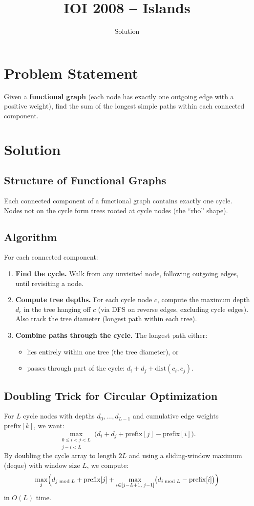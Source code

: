 \documentclass[11pt,a4paper]{article}
\title{IOI 2008 -- Islands}
\author{Solution}
\date{}
\begin{document}
\maketitle

\section{Problem Statement}
Given a \textbf{functional graph} (each node has exactly one outgoing edge with a positive weight), find the sum of the longest simple paths within each connected component.

\section{Solution}

\subsection{Structure of Functional Graphs}
Each connected component of a functional graph contains exactly one cycle. Nodes not on the cycle form trees rooted at cycle nodes (the ``rho'' shape).

\subsection{Algorithm}
For each connected component:
\begin{enumerate}
    \item \textbf{Find the cycle.} Walk from any unvisited node, following outgoing edges, until revisiting a node.
    \item \textbf{Compute tree depths.} For each cycle node $c$, compute the maximum depth $d_c$ in the tree hanging off $c$ (via DFS on reverse edges, excluding cycle edges). Also track the tree diameter (longest path within each tree).
    \item \textbf{Combine paths through the cycle.} The longest path either:
    \begin{itemize}
        \item lies entirely within one tree (the tree diameter), or
        \item passes through part of the cycle: $d_i + d_j + \text{dist}(c_i, c_j)$.
    \end{itemize}
\end{enumerate}

\subsection{Doubling Trick for Circular Optimization}
For $L$ cycle nodes with depths $d_0, \ldots, d_{L-1}$ and cumulative edge weights $\text{prefix}[k]$, we want:
\[
\max_{\substack{0 \le i < j < L \\ j - i < L}} \bigl(d_i + d_j + \text{prefix}[j] - \text{prefix}[i]\bigr).
\]
By doubling the cycle array to length $2L$ and using a sliding-window maximum (deque) with window size $L$, we compute:
\[
\max_j \Bigl(d_{j \bmod L} + \text{prefix}[j] + \max_{i \in [j-L+1,\; j-1]} \bigl(d_{i \bmod L} - \text{prefix}[i]\bigr)\Bigr)
\]
in $O(L)$ time.
\end{document}
